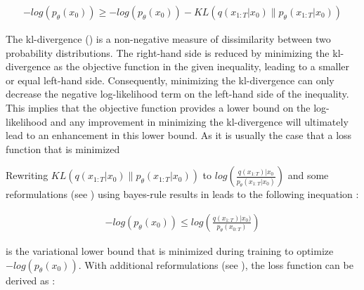 \begin{equation}
  \label{eqn:vlb}
  \begin{align*}
    -log(p_\theta(x_0)) \geq -log(p_\theta(x_0)) - KL(q(x_{1:T}|x_0) \parallel p_\theta(x_{1:T}|x_0))
  \end{align*}
\end{equation}

The \gls{kl}-divergence () is a non-negative measure of dissimilarity between two probability distributions. 
The right-hand side is reduced by minimizing the \gls{kl}-divergence as the objective function in the given inequality, leading to a smaller or equal left-hand side. 
Consequently, minimizing the \gls{kl}-divergence can only decrease the negative log-likelihood term on the left-hand side of the inequality. 
This implies that the objective function provides a lower bound on the log-likelihood and any improvement in minimizing the \gls{kl}-divergence will ultimately lead to an enhancement in this lower bound.
As it is usually the case that a loss function that is minimized

Rewriting $KL(q(x_{1:T}|x_0) \parallel p_\theta(x_{1:T}|x_0))$ to $log(\frac{q(x_{1:T})|x_0}{p_\theta(x_{1:T}|x_0)})$ and some reformulations (see ) using bayes-rule results in  leads to the following inequation \cite{ho2020DenoisingDiffusionProbabilistic}:

\begin{equation}
  \label{eqn:vlb2}
  \begin{align*}
    -log(p_\theta(x_0)) \leq log(\frac{q(x_{1:T})|x_0)}{p_\theta(x_{0:T})})
  \end{align*}
\end{equation}

 is the variational lower bound that is minimized during training to optimize $-log(p_\theta(x_0))$.
With additional reformulations (see ), the loss function can be derived as \cite{ho2020DenoisingDiffusionProbabilistic}:


